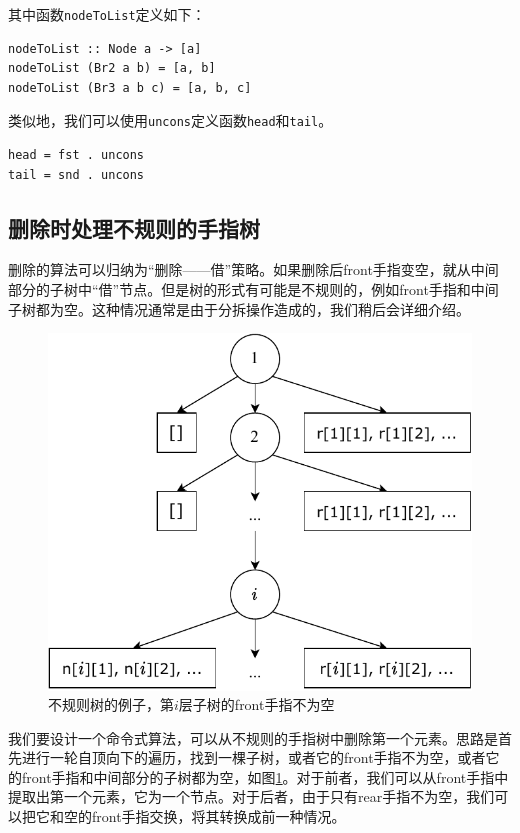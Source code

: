 \documentclass[b5paper]{ctexart}
\begin{document}
其中函数\texttt{nodeToList}定义如下：

\begin{lstlisting}[style=Haskell]
nodeToList :: Node a -> [a]
nodeToList (Br2 a b) = [a, b]
nodeToList (Br3 a b c) = [a, b, c]
\end{lstlisting}

类似地，我们可以使用\texttt{uncons}定义函数\texttt{head}和\texttt{tail}。

\begin{lstlisting}[style=Haskell]
head = fst . uncons
tail = snd . uncons
\end{lstlisting}

\subsection{删除时处理不规则的手指树}
删除的算法可以归纳为“删除——借”策略。如果删除后front手指变空，就从中间部分的子树中“借”节点。但是树的形式有可能是不规则的，例如front手指和中间子树都为空。这种情况通常是由于分拆操作造成的，我们稍后会详细介绍。

\begin{figure}[htbp]
  \centering
  \includegraphics[scale=0.4]{img/ftr-illed-1}
  \caption{不规则树的例子，第$i$层子树的front手指不为空} \label{fig:ftr-illed-form}
\end{figure}

我们要设计一个命令式算法，可以从不规则的手指树中删除第一个元素。思路是首先进行一轮自顶向下的遍历，找到一棵子树，或者它的front手指不为空，或者它的front手指和中间部分的子树都为空，如图\ref{fig:ftr-illed-form}。对于前者，我们可以从front手指中提取出第一个元素，它为一个节点。对于后者，由于只有rear手指不为空，我们可以把它和空的front手指交换，将其转换成前一种情况。
\end{document}
